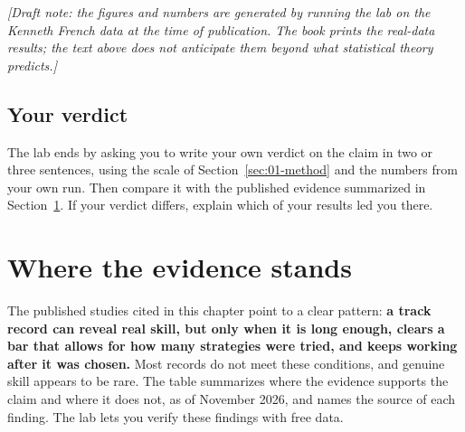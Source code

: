 \emph{[Draft note: the figures and numbers are generated by running the lab on the Kenneth French data at the time of publication. The book prints the real-data results; the text above does not anticipate them beyond what statistical theory predicts.]}

\subsection*{Your verdict}

The lab ends by asking you to write your own verdict on the claim in two or three sentences, using the scale of Section~\ref{sec:01-method} and the numbers from your own run. Then compare it with the published evidence summarized in Section~\ref{sec:01-verdict}. If your verdict differs, explain which of your results led you there.

\section{Where the evidence stands}
\label{sec:01-verdict}

The published studies cited in this chapter point to a clear pattern: \textbf{a track record can reveal real skill, but only when it is long enough, clears a bar that allows for how many strategies were tried, and keeps working after it was chosen.} Most records do not meet these conditions, and genuine skill appears to be rare. The table summarizes where the evidence supports the claim and where it does not, as of November 2026, and names the source of each finding. The lab lets you verify these findings with free data.

